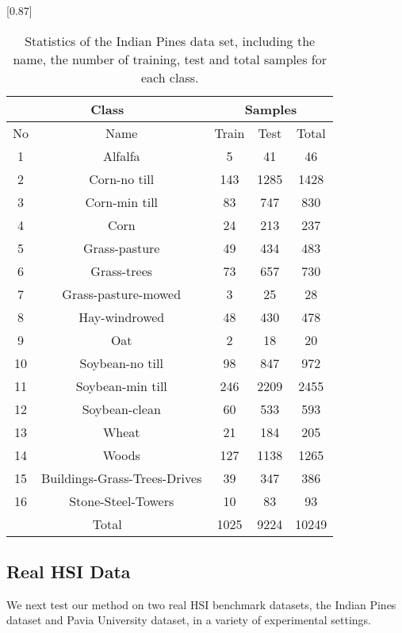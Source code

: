 \documentclass[journal]{IEEEtran}
\begin{document}
		\begin{table}[htp]
			\caption{\label{table1} Statistics of the Indian Pines data set, including the name, the number of training, test and total samples for each class.}
			\begin{center}
				{\normalsize
					\scalebox{0.87}[0.87]
					{
						\begin{tabular}{|c|c|c|c|c|}
							\hline
							\multicolumn{2}{|c}{Class} & \multicolumn{3}{|c|}{Samples}\\
							\hline
							No & Name & Train & Test & Total\\
							\hline
							1 & Alfalfa & 5   & 41   & 46   \\
							2 & Corn-no till & 143 & 1285 & 1428 \\
							3 & Corn-min till & 83  & 747  & 830  \\
							4 &  Corn   & 24  & 213  & 237  \\
							5 & Grass-pasture & 49  & 434  & 483  \\
							6 & Grass-trees   & 73  & 657  & 730  \\
							7 & Grass-pasture-mowed & 3 & 25 & 28 \\
							8 & Hay-windrowed   & 48  & 430  & 478  \\
							9 &  Oat    & 2  & 18    & 20\\
							10 & Soybean-no till & 98 & 847 & 972\\
							11 & Soybean-min till &	246 & 2209 & 2455\\
							12 & Soybean-clean  & 60 & 533 & 593\\
							13 & Wheat & 21 & 184 & 205\\
							14 & Woods & 127 & 1138 & 1265\\
							15 & Buildings-Grass-Trees-Drives & 39 & 347 & 386\\
							16 & Stone-Steel-Towers	& 10 & 83 & 93\\
							\hline
							\multicolumn{2}{|c|}{Total} & 1025 & 9224 & 10249\\
							\hline
						\end{tabular}
					}
				}
			\end{center}
		\end{table}	
		
		
		\subsection{Real HSI Data}
		We next test our method on two real HSI benchmark datasets, the Indian Pines dataset and Pavia University dataset, in a variety of experimental settings.
		
\end{document}
